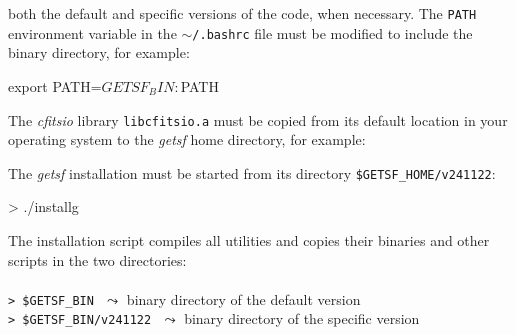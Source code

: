 \documentclass[a4paper,10pt]{article}
\begin{document}
both the default and specific versions of the code, when necessary. The \verb!PATH! environment variable in the
$\sim$\verb!/.bashrc! file must be modified to include the binary directory, for example:
\begin{verbnobox}[\mbox{}\small] 
export PATH=$GETSF_BIN:$PATH
\end{verbnobox} 
The \textsl{cfitsio} library \verb!libcfitsio.a! must be copied from its default location in your operating system to the
\textsl{getsf} home directory, for example:
The \textsl{getsf} installation must be started from its directory
\verb!$GETSF_HOME/v241122!:
\begin{verbnobox}[\mbox{}\small] 
> ./installg
\end{verbnobox} 
The installation script compiles all utilities and copies their binaries and other scripts in the two directories:\\
\vspace{-2mm}\noindent\\
{\small\verb!> $GETSF_BIN!} $\,\,\leadsto$ binary directory of the default version\\
{\small\verb!> $GETSF_BIN/v241122!\vspace{-2mm}} $\,\,\leadsto$ binary directory of the specific version\\\\
\end{document}
